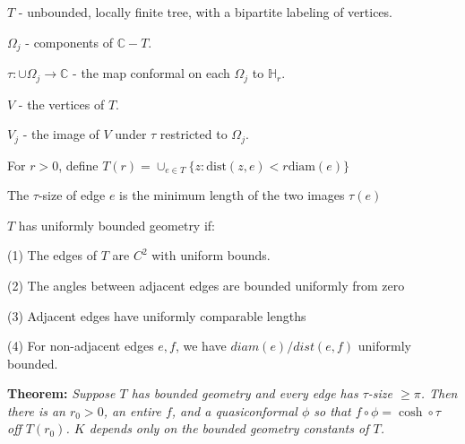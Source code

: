\documentclass{beamer}
\begin{document}
\begin{frame}

{\tiny $T$ - unbounded, locally finite tree, with a bipartite labeling of vertices.

$\Omega_j$ - components of $\mathbb{C}-T$.

$\tau: \cup \Omega_j \rightarrow \mathbb{C}$ - the map conformal on each $\Omega_j$ to $\mathbb{H}_r$.

$V$ - the vertices of $T$. 

$V_j$ - the image of $V$ under $\tau$ restricted to $\Omega_j$.

For $r > 0$, define $T(r) = \cup_{e\in T} \{z : \textrm{dist}(z,e) < r\textrm{diam}(e) \}$

The $\tau$-size of edge $e$ is the minimum length of the two images $\tau(e)$

\vspace{2.5mm}

$T$ has uniformly bounded geometry if: 

\hspace{5mm} (1) The edges of $T$ are $C^2$ with uniform bounds. 

\hspace{5mm} (2) The angles between adjacent edges are bounded uniformly from zero

\hspace{5mm} (3) Adjacent edges have uniformly comparable lengths

\hspace{5mm} (4) For non-adjacent edges $e, f$, we have $diam(e)/dist(e,f)$ uniformly bounded. 

 }
\vspace{5mm}
{\bf Theorem:} {\it  Suppose $T$ has bounded geometry and every edge has $\tau$-size $\geq \pi$.  Then there is an $r_0 > 0$, an entire $f$, and a quasiconformal $\phi$ so that $f \circ \phi = \cosh \circ \tau$ off $T(r_0)$. $K$ depends only on the bounded geometry constants of $T$. }  

\end{frame}
\end{document}
